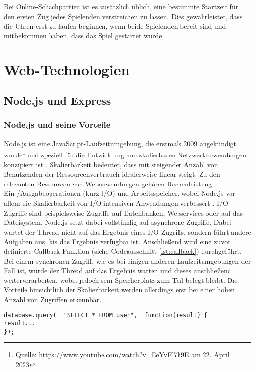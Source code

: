 Bei Online-Schachpartien ist es zusätzlich üblich, eine bestimmte Startzeit für den ersten Zug jedes Spielenden verstreichen zu lassen. Dies gewährleistet, dass die Uhren erst zu laufen beginnen, wenn beide Spielenden bereit sind und mitbekommen haben, dass das Spiel gestartet wurde.

    \section{Web-Technologien}
        \subsection{Node.js und Express}
        \subsubsection{Node.js und seine Vorteile}
        \label{sec:node.js}
Node.js ist eine JavaScript-Laufzeitumgebung, die erstmals 2009 angekündigt wurde\footnote{Quelle: \url{https://www.youtube.com/watch?v=EeYvFl7li9E} am 22. April 2023} und speziell für die Entwicklung von skalierbaren Netzwerkanwendungen konzipiert ist \cite{nodejs}. Skalierbarkeit bedeutet, dass mit steigender Anzahl von Benutzenden der Ressourcenverbrauch idealerweise linear steigt. Zu den relevanten Ressourcen von Webanwendungen gehören Rechenleistung, Ein-/Ausgabeoperationen (kurz I/O) und Arbeitsspeicher, wobei Node.js vor allem die Skalierbarkeit von I/O intensiven Anwendungen verbessert \cite{nodejsbook}.
I/O-Zugriffe sind beispielsweise Zugriffe auf Datenbanken, Webservices oder auf das Dateisystem. Node.js setzt dabei vollständig auf asynchrone Zugriffe. Dabei wartet der Thread nicht auf das Ergebnis eines I/O-Zugriffs, sondern führt andere Aufgaben aus, bis das Ergebnis verfügbar ist. Anschließend wird eine zuvor definierte Callback Funktion (siehe Codeausschnitt \ref{lst:callback}) durchgeführt. Bei einem synchronen Zugriff, wie es bei einigen anderen Laufzeitumgebungen der Fall ist, würde der Thread auf das Ergebnis warten und dieses anschließend weiterverarbeiten, wobei jedoch sein Speicherplatz zum Teil belegt bleibt.\cite{nodejsbook} Die Vorteile hinsichtlich der Skalierbarkeit werden allerdings erst bei einer hohen Anzahl von Zugriffen erkennbar.

\begin{lstlisting}[style=codeStyle, caption={Beispiel einer Callback Funktion \textbf{Quelle: } \cite{nodejsbook}}, label={lst:callback}]
database.query(  "SELECT * FROM user",  function(result) {
result...
});
\end{lstlisting}


